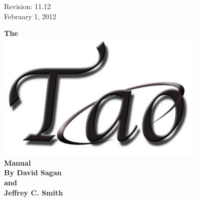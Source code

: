 \thispagestyle{empty}

\begin{flushright}
\large
  Revision: 11.12 \\
  February 1, 2012 \\
\end{flushright}

\vfill

{
\begin{center}
{\Huge \sf\bf The} \\
\vskip 0.1in
\includegraphics[width=10cm]{tao-logo.pdf} \\
\vskip 0.1in
{\Huge \sf\bf Manual} \\
\vskip 0.4in
{\Large \sf\bf By David Sagan \\ and \\ Jeffrey C. Smith} \\
\end{center}
}

\vfill
\break
